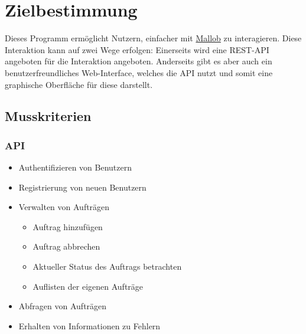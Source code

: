 \section{Zielbestimmung}
Dieses Programm ermöglicht Nutzern, einfacher mit \href{https://github.com/domschrei/mallob}{Mallob} zu interagieren. Diese Interaktion kann auf zwei Wege erfolgen:
Einerseits wird eine REST-API angeboten für die Interaktion angeboten. Anderseits gibt es aber auch ein benutzerfreundliches Web-Interface, welches die API nutzt und somit eine graphische Oberfläche für diese darstellt.
\subsection{Musskriterien}
    \subsubsection{API}
        \begin{itemize}
            \item Authentifizieren von Benutzern
            \item Registrierung von neuen Benutzern
            \item Verwalten von Aufträgen
                \begin{itemize}
                    \item Auftrag hinzufügen
                    \item Auftrag abbrechen
                    \item Aktueller Status des Auftrags betrachten
                    \item Auflisten der eigenen Aufträge
                \end{itemize}
            \item Abfragen von Aufträgen
            \item Erhalten von Informationen zu Fehlern
        \end{itemize}
